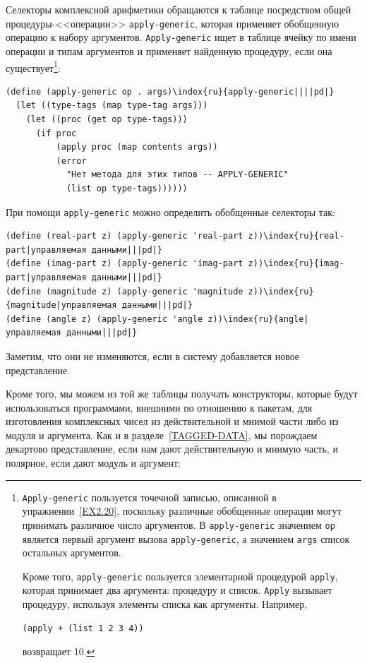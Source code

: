 Селекторы комплексной арифметики обращаются к таблице 
посредством общей про\-це\-ду\-ры-<<операции>> {\tt apply-generic}, 
которая применяет обобщенную операцию к набору аргументов.
{\tt Apply-generic} ищет в таблице ячейку по имени операции и
типам аргументов и применяет найденную процедуру, если она
существует\footnote{{\tt Apply-generic} пользуется 
точечной записью, описанной в упражнении~\ref{EX2.20},  
поскольку различные обобщенные операции могут принимать различное
число аргументов. В {\tt apply-generic} значением
{\tt op} является первый аргумент вызова
{\tt apply-generic}, а значением {\tt args} список
остальных аргументов.

Кроме того, {\tt apply-generic} пользуется
элементарной процедурой  {\tt apply}, которая принимает два
аргумента: процедуру и список.  {\tt Apply} вызывает
процедуру, используя элементы списка как аргументы.  Например,

\begin{Verbatim}[fontsize=\footnotesize]
(apply + (list 1 2 3 4))
\end{Verbatim}
возвращает 10.}:


\begin{Verbatim}[fontsize=\small]
(define (apply-generic op . args)\index{ru}{apply-generic||||pd|}
  (let ((type-tags (map type-tag args)))
    (let ((proc (get op type-tags)))
      (if proc
          (apply proc (map contents args))
          (error
            "Нет метода для этих типов -- APPLY-GENERIC"
            (list op type-tags))))))
\end{Verbatim}
При помощи {\tt apply-generic} можно определить обобщенные
селекторы так:

\begin{Verbatim}[fontsize=\small]
(define (real-part z) (apply-generic 'real-part z))\index{ru}{real-part|управляемая данными|||pd|}
(define (imag-part z) (apply-generic 'imag-part z))\index{ru}{imag-part|управляемая данными|||pd|}
(define (magnitude z) (apply-generic 'magnitude z))\index{ru}{magnitude|управляемая данными|||pd|}
(define (angle z) (apply-generic 'angle z))\index{ru}{angle|управляемая данными|||pd|}
\end{Verbatim}
Заметим, что они не изменяются, если в систему добавляется новое
представление.

Кроме того, мы можем из той же таблицы получать
конструкторы, которые будут использоваться программами, внешними по
отношению к пакетам, для изготовления комплексных чисел из
действительной и мнимой части либо из модуля и аргумента.  Как и в
разделе~\ref{TAGGED-DATA}, мы порождаем декартово
представление, если нам дают действительную и мнимую часть, и
полярное, если дают модуль и аргумент:

